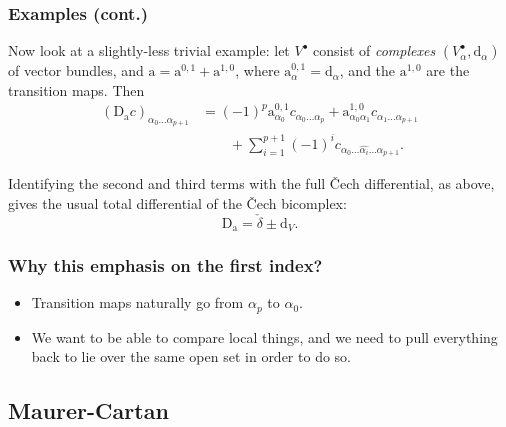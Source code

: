 \documentclass{beamer}
\begin{document}
            \begin{frame}\frametitle{Examples (cont.)}
                \begin{example}
                    Now look at a slightly-less trivial example: let $V^\bullet$ consist of \emph{complexes} $(V_\alpha^\bullet,\mathrm{d}_\alpha)$ of vector bundles, and $\mathrm{a} = \mathrm{a}^{0,1}+\mathrm{a}^{1,0}$, where $\mathrm{a}_{\alpha}^{0,1} = \mathrm{d}_\alpha$, and the $\mathrm{a}^{1,0}$ are the transition maps.
                    Then
                    \begin{align*}
                        (\mathrm{D}_\mathrm{a}c)_{\alpha_0\ldots\alpha_{p+1}} &= (-1)^p\mathrm{a}_{\alpha_0}^{0,1}c_{\alpha_0\ldots\alpha_p} + \mathrm{a}_{\alpha_0\alpha_1}^{1,0}c_{\alpha_1\ldots\alpha_{p+1}}\\
                        &\qquad+\sum_{i=1}^{p+1}(-1)^i c_{\alpha_0\ldots\widehat{\alpha_i}\ldots\alpha_{p+1}}.
                    \end{align*}

                    \pause
                    
                    Identifying the second and third terms with the full Čech differential, as above, gives the usual total differential of the Čech bicomplex:
                    \begin{equation*}
                        \mathrm{D}_\mathrm{a} = \check{\delta} \pm \mathrm{d}_V.
                    \end{equation*}
                \end{example}
            \end{frame}

            \begin{frame}\frametitle{Why this emphasis on the first index?}
                \begin{itemize}
                    \item Transition maps naturally go from $\alpha_p$ to $\alpha_0$.
                    \pause
                    \item We want to be able to compare local things, and we need to pull everything back to lie over the same open set in order to do so.
                \end{itemize}
            \end{frame}

        \subsection{Maurer-Cartan}
\end{document}
